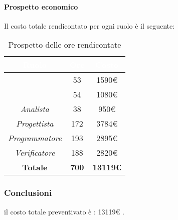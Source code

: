 \paragraph{Prospetto economico}
Il costo totale rendicontato per ogni ruolo è il seguente:
\begin{table}[H]
	\begin{center}
		\begin{tabular}{ |c c c| }
		\rowcolor{darkblue} 
		\textcolor{white}{\textbf{Ruolo}} & \textcolor{white}{\textbf{Ore}} & \textcolor{white}{\textbf{Costo}} \\ \hline
		\textit{\Responsabile} 	& 53 	& 1590€ \\ \hline
		\textit{\Amministratore} 	& 54 	& 1080€ \\ \hline
		\textit{Analista} 		& 38 	& 950€ \\ \hline
		\textit{Progettista} 	& 172 	& 3784€ \\ \hline
		\textit{Programmatore} 	& 193 	& 2895€ \\ \hline
		\textit{Verificatore} 	& 188 	& 2820€ \\ \hline
		\textbf{Totale} & \textbf{700} & \textbf{13119€} \\ \hline
		\end{tabular}
	\caption{ Prospetto delle ore rendicontate}
	\end{center}
\end{table}
\subsubsection{Conclusioni}
il costo totale preventivato è : 13119€ .

